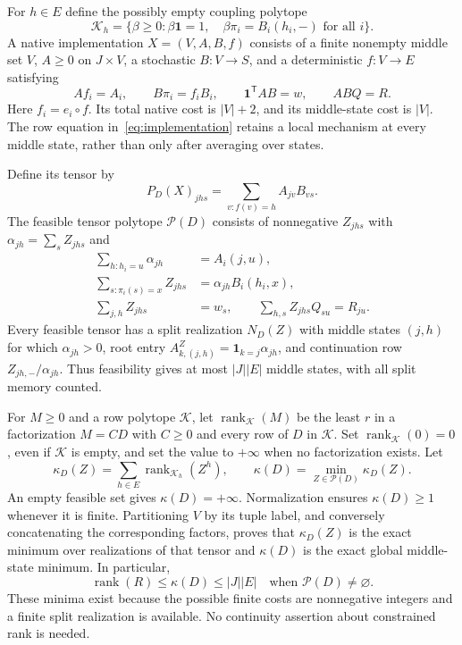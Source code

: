 \documentclass[11pt]{article}
\newcommand{\one}{\mathbf 1}
\newcommand{\Kcal}{\mathcal K}
\newcommand{\Pcal}{\mathcal P}
\newcommand{\rank}{\operatorname{rank}}
\theoremstyle{remark}
\begin{document}
For $h\in E$ define the possibly empty coupling polytope
\begin{equation}\label{eq:Kh}
 \Kcal_h=\{\beta\ge0:\beta\one=1,\quad
                 \beta\pi_i=B_i(h_i,-)\text{ for all }i\}.
\end{equation}
A native implementation $X=(V,A,B,f)$ consists of a finite nonempty middle set $V$, $A\ge0$ on $J\times V$, a stochastic $B:V\to S$, and a deterministic $f:V\to E$ satisfying
\begin{equation}\label{eq:implementation}
 Af_i=A_i,\qquad B\pi_i=f_iB_i,\qquad
 \one^{\mathsf T}AB=w,\qquad ABQ=R.
\end{equation}
Here $f_i=e_i\circ f$. Its total native cost is $|V|+2$, and its middle-state cost is $|V|$. The row equation in~\eqref{eq:implementation} retains a local mechanism at every middle state, rather than only after averaging over states.

Define its tensor by
\begin{equation}\label{eq:tensor-extraction}
 P_D(X)_{jhs}=\sum_{v:f(v)=h}A_{jv}B_{vs}.
\end{equation}
The feasible tensor polytope $\Pcal(D)$ consists of nonnegative $Z_{jhs}$ with $\alpha_{jh}=\sum_sZ_{jhs}$ and
\begin{align}
 \sum_{h:h_i=u}\alpha_{jh}&=A_i(j,u),\label{eq:tensor-root}\\
 \sum_{s:\pi_i(s)=x}Z_{jhs}&=\alpha_{jh}B_i(h_i,x),\label{eq:tensor-row}\\
 \sum_{j,h}Z_{jhs}&=w_s,\qquad
 \sum_{h,s}Z_{jhs}Q_{su}=R_{ju}.\label{eq:tensor-global}
\end{align}
Every feasible tensor has a split realization $N_D(Z)$ with middle states $(j,h)$ for which $\alpha_{jh}>0$, root entry $A^Z_{k,(j,h)}=\mathbf1_{k=j}\alpha_{jh}$, and continuation row $Z_{jh,-}/\alpha_{jh}$. Thus feasibility gives at most $|J||E|$ middle states, with all split memory counted.

For $M\ge0$ and a row polytope $\Kcal$, let $\rank_{\Kcal}(M)$ be the least $r$ in a factorization $M=CD$ with $C\ge0$ and every row of $D$ in $\Kcal$. Set $\rank_{\Kcal}(0)=0$, even if $\Kcal$ is empty, and set the value to $+\infty$ when no factorization exists. Let
\begin{equation}\label{eq:kappa}
 \kappa_D(Z)=\sum_{h\in E}\rank_{\Kcal_h}(Z^h),\qquad
 \kappa(D)=\min_{Z\in\Pcal(D)}\kappa_D(Z).
\end{equation}
An empty feasible set gives $\kappa(D)=+\infty$. Normalization ensures $\kappa(D)\ge1$ whenever it is finite. Partitioning $V$ by its tuple label, and conversely concatenating the corresponding factors, proves that $\kappa_D(Z)$ is the exact minimum over realizations of that tensor and $\kappa(D)$ is the exact global middle-state minimum. In particular,
\begin{equation}\label{eq:rank-bound}
 \rank(R)\le\kappa(D)\le |J||E|
 \quad\text{when }\Pcal(D)\ne\varnothing.
\end{equation}
These minima exist because the possible finite costs are nonnegative integers and a finite split realization is available. No continuity assertion about constrained rank is needed.
\end{document}
